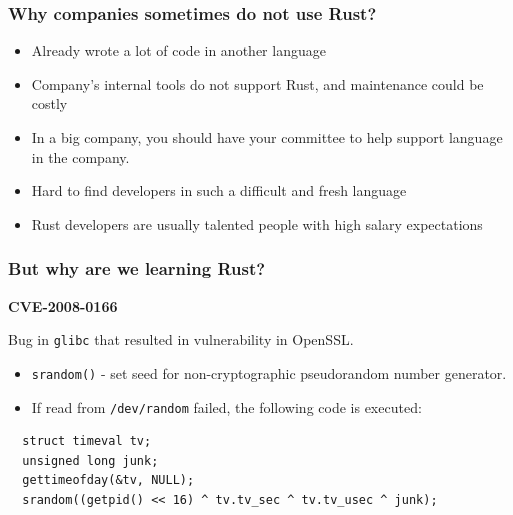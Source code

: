 \documentclass[aspectratio=1610,t]{beamer}
\begin{document}

\begin{frame}
\frametitle{Why companies sometimes do \textbf{not} use Rust?}

\begin{itemize}
    \item Already wrote a lot of code in another language
    \item Company's internal tools do not support Rust, and maintenance could be costly
    \item In a big company, you should have your committee to help support language in the company.
    \item Hard to find developers in such a difficult and fresh language
    \item Rust developers are usually talented people with high salary expectations
\end{itemize}
\end{frame}



\begin{frame}[fragile]
\frametitle{But why are we learning Rust?}
\textbf{CVE-2008-0166}

Bug in \texttt{glibc} that resulted in vulnerability in OpenSSL.

\begin{itemize}
    \item \texttt{srandom()} - set seed for non-cryptographic pseudorandom number generator.
    \item If read from \texttt{/dev/random} failed, the following code is executed:
\end{itemize}

\begin{verbatim}
  struct timeval tv;
  unsigned long junk;
  gettimeofday(&tv, NULL);
  srandom((getpid() << 16) ^ tv.tv_sec ^ tv.tv_usec ^ junk);
\end{verbatim}

\end{frame}

\end{document}
